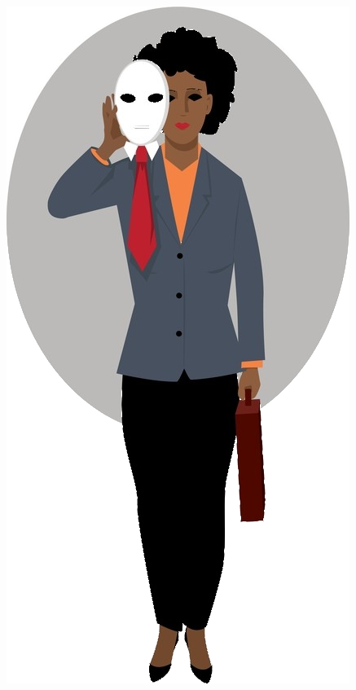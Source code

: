 \documentclass[aspectratio=169,usenames,dvipsnames]{beamer}
\begin{document}
\begin{frame}
\begin{minipage}{0.5\textwidth}
\begin{center}
\end{center}
\end{minipage}\begin{minipage}{0.5\textwidth}
\begin{center}
\pause
\includegraphics[keepaspectratio, height=0.75\textheight]{images/human_bias}
\end{center}
\end{minipage}
\end{frame}
\end{document}
